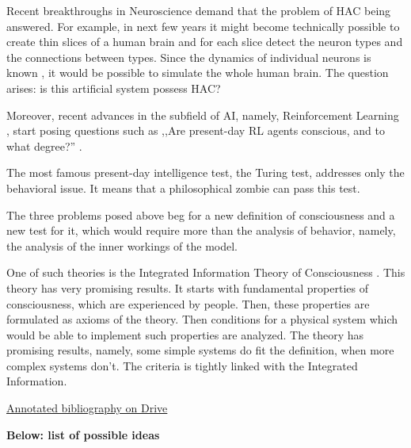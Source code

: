 \documentclass[a4paper, 12pt]{article}
\begin{document}
Recent breakthroughs in Neuroscience demand that the problem of HAC being answered. For example, in next few years it might become technically possible \cite{bluebrain} to create thin slices of a human brain and for each slice detect the neuron types and the connections between types. Since the dynamics of individual neurons is known \cite{hh}, it would be possible to simulate the whole human brain. The question arises: is this artificial system possess HAC?

Moreover, recent advances in the subfield of AI, namely, Reinforcement Learning \cite{rl}, start posing questions such as ,,Are present-day RL agents conscious, and to what degree?'' \cite{tomasik}.

The most famous present-day intelligence test, the Turing test, addresses only the behavioral issue. It means that a philosophical zombie can pass this test.

The three problems posed above beg for a new definition of consciousness and a new test for it, which would require more than the analysis of behavior, namely, the analysis of the inner workings of the model.

One of such theories is the Integrated Information Theory of Consciousness \cite{iit}. This theory has very promising results. It starts with fundamental properties of consciousness, which are experienced by people. Then, these properties are formulated as axioms of the theory. Then conditions for a physical system which would be able to implement such properties are analyzed. The theory has promising results, namely, some simple systems do fit the definition, when more complex systems don't. The criteria is tightly linked with the Integrated Information.

\href{https://docs.google.com/document/d/1kh4wC9YHNJEcCBxE1eaymw9PPa1VdCW25BH0GEIQgj4/edit#heading=h.ptmcnj925n6h}{Annotated bibliography on Drive}

{\bf Below: list of possible ideas}

\end{document}
